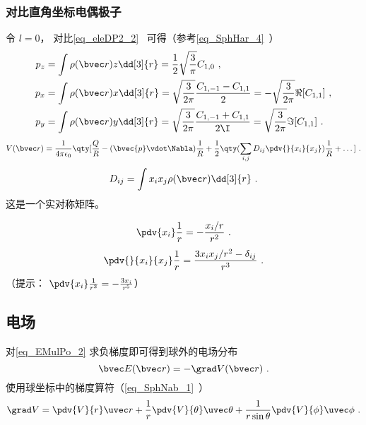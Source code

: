 \subsubsection{对比直角坐标电偶极子}
令 $l=0$， 对比\autoref{eq_eleDP2_2}~ 可得（参考\autoref{eq_SphHar_4}~）
\begin{align} %
p_z &= \int\rho(\bvec r)z\dd[3]{r} = \frac12\sqrt{\frac{3}{\pi}} C_{1,0}~,\\
p_x &= \int\rho(\bvec r)x\dd[3]{r} = \sqrt{\frac{3}{2\pi}} \frac{C_{1,-1}-C_{1,1}}{2} = -\sqrt{\frac{3}{2\pi}} \Re[C_{1,1}]~,\\
p_y &= \int\rho(\bvec r)y\dd[3]{r} = \sqrt{\frac{3}{2\pi}} \frac{C_{1,-1}+C_{1,1}}{2\I} = \sqrt{\frac{3}{2\pi}} \Im[C_{1,1}]~.
\end{align}
\begin{equation}
V(\bvec r) = \frac{1}{4\pi\epsilon_0} \qty[\frac{Q}{R} - (\bvec{p} \vdot \Nabla)\frac{1}{R} + \frac{1}{2}\qty(\sum_{i,j} D_{ij}\pdv{}{x_i}{x_j})\frac{1}{R} + \dots]~.
\end{equation}
\begin{equation}
D_{ij}= \int x_i x_j \rho(\bvec r) \dd[3]{r}~.
\end{equation}
这是一个实对称矩阵。

\begin{equation}
\pdv{x_i}\frac{1}{r} = -\frac{x_i/r}{r^2}~.
\end{equation}
\begin{equation}
\pdv{}{x_i}{x_j}\frac{1}{r} = \frac{3x_ix_j/r^2 - \delta_{ij}}{r^3}~.
\end{equation}
（提示： $\pdv{x_i}\frac{1}{r^3} = -\frac{3x_i}{r^5}$）


\subsection{电场}
对\autoref{eq_EMulPo_2} 求负梯度即可得到球外的电场分布
\begin{equation}
\bvec E(\bvec r) = -\grad V(\bvec r)~.
\end{equation}
使用球坐标中的梯度算符（\autoref{eq_SphNab_1}~）
\begin{equation}
\grad V = \pdv{V}{r}\uvec r + \frac{1}{r} \pdv{V}{\theta}\uvec \theta  + \frac{1}{r\sin \theta }\pdv{V}{\phi}\uvec \phi~.
\end{equation}

